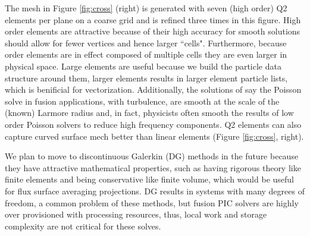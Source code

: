 \documentclass[review]{siamart}
\begin{document}
The mesh in Figure \ref{fig:cross} (right) is generated with seven (high order) Q2 elements per plane on a coarse grid and is refined three times in this figure.
High order elements are attractive because of their high accuracy for smooth solutions should allow for fewer vertices and hence larger ``cells".
Furthermore, because order elements are in effect composed of multiple cells they are even larger in physical space.
Large elements are useful because we build the particle data structure around them, larger elements results in larger element particle lists, which is benificial for vectorization.
Additionally, the solutions of say the Poisson solve in fusion applications, with turbulence, are smooth at the scale of the (known) Larmore radius and, in fact, physicists often smooth the results of low order Poisson solvers to reduce high frequency components.
Q2 elements can also capture curved surface mech better than linear elements (Figure \ref{fig:cross}, right).

We plan to move to discontinuous Galerkin (DG) methods in the future because they have attractive mathematical properties, such as having rigorous theory like finite elements and being conservative like finite volume, which would be useful for flux surface averaging projections.
DG results in systems with many degrees of freedom, a common problem of these methods, but fusion PIC solvers are highly over provisioned with processing resources, thus, local work and storage complexity are not critical for these solves.


 
\end{document}
